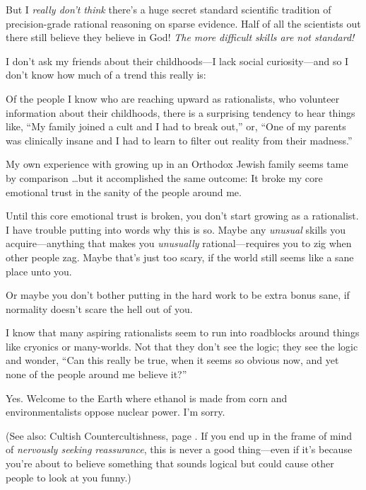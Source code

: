 {
 But I \textit{really don't think}
there's a huge secret standard scientific tradition of
precision-grade rational reasoning on sparse evidence. Half of all the
scientists out there still believe they believe in God! \textit{The
more difficult skills are not standard!}}

\myendsectiontext


{
 I don't ask my friends about their childhoods---I
lack social curiosity---and so I don't know how much of
a trend this really is: }

{
 Of the people I know who are reaching upward as rationalists, who
volunteer information about their childhoods, there is a surprising
tendency to hear things like, ``My family joined a
cult and I had to break out,'' or,
``One of my parents was clinically insane and I had to
learn to filter out reality from their madness.''}

{
 My own experience with growing up in an Orthodox Jewish family
seems tame by comparison \ldots but it accomplished the same outcome: It
broke my core emotional trust in the sanity of the people around me.}

{
 Until this core emotional trust is broken, you
don't start growing as a rationalist. I have trouble
putting into words why this is so. Maybe any \textit{unusual} skills
you acquire---anything that makes you \textit{unusually}
rational---requires you to zig when other people zag. Maybe
that's just too scary, if the world still seems like a
sane place unto you.}

{
 Or maybe you don't bother putting in the hard work
to be extra bonus sane, if normality doesn't scare the
hell out of you.}

{
 I know that many aspiring rationalists seem to run into roadblocks
around things like cryonics or many-worlds. Not that they
don't see the logic; they see the logic and wonder,
``Can this really be true, when it seems so obvious
now, and yet none of the people around me believe
it?''}

{
 Yes. Welcome to the Earth where ethanol is made from corn and
environmentalists oppose nuclear power. I'm sorry.}

{
 (See also: Cultish Countercultishness, page \pageref{cultish_countercultishness}. If you end up in the frame
of mind of \textit{nervously seeking reassurance}, this is never a good
thing---even if it's because you're
about to believe something that sounds logical but could cause other
people to look at you funny.)}

